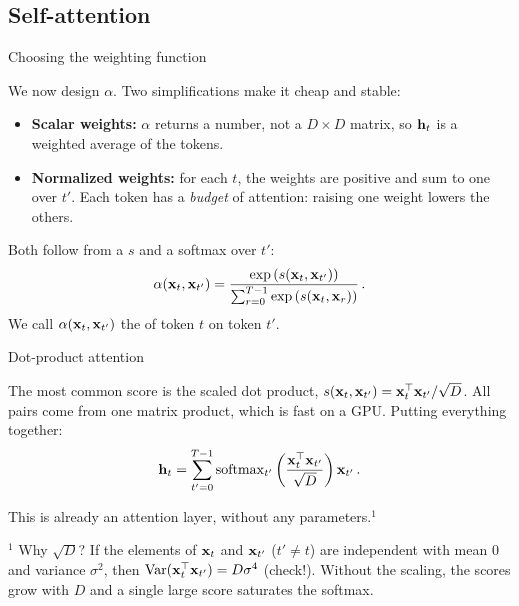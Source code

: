 \subsection{Self-attention}

\begin{frame}{Choosing the weighting function}
    \setlength{\parskip}{6pt}

    We now design $\alpha$. Two simplifications make it cheap and stable:
    \begin{itemize}
        \item \textbf{Scalar weights:} $\alpha$ returns a number, not a
              $D\times D$ matrix, so $\vc{h}_t$ is a weighted average of the
              tokens.
        \item \textbf{Normalized weights:} for each $t$, the weights are
              positive and sum to one over $t'$. Each token has a
              \textit{budget} of attention: raising one weight lowers the
              others.
    \end{itemize}

    Both follow from a  $s$ and a softmax over $t'$:
    \[
        \alpha(\vc{x}_t,\vc{x}_{t'})
        =\frac{\exp\left(s(\vc{x}_t,\vc{x}_{t'})\right)}
        {\sum_{r=0}^{T-1}\exp\left(s(\vc{x}_t,\vc{x}_{r})\right)} \,.
    \]
    We call $\alpha(\vc{x}_t,\vc{x}_{t'})$ the 
    of token $t$ on token $t'$.

\end{frame}

\begin{frame}{Dot-product attention}
    \setlength{\parskip}{6pt}

    The most common score is the scaled dot product, $s(\vc{x}_t,\vc{x}_{t'})
        =\vc{x}_t^{\top}\vc{x}_{t'}/\sqrt{D}$. All pairs come from one matrix
    product, which is fast on a GPU. Putting everything together:
    \[
        \vc{h}_t=\sum_{t'=0}^{T-1}
        \eqnmarkbox[drawblue]{sm}{\operatorname{softmax}_{t'}}
        \left(\frac{\vc{x}_t^{\top}\vc{x}_{t'}}{\sqrt{D}}\right)\vc{x}_{t'} \,.
    \]
    \vspace{0.6em}

    This is already an attention layer, without any parameters.$^1$

    \vfill
    {\footnotesize\color{black!60} $^1$ Why $\sqrt{D}$? If the elements of
        $\vc{x}_t$ and $\vc{x}_{t'}$ ($t'\neq t$) are independent with mean $0$
        and variance $\sigma^2$, then $\operatorname{Var}(\vc{x}_t^{\top}\vc{x}_{t'})=D\sigma^4$
        (check!). Without the scaling, the scores grow with $D$ and a single large
        score saturates the softmax.\par}

\end{frame}

